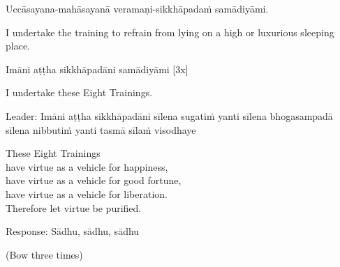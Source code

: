 Uccāsayana-mahāsayanā veramaṇi-sikkhāpadaṁ samādiyāmi.

\begin{english-verses}
  I undertake the training to refrain from lying on a high or luxurious sleeping place.
\end{english-verses}

Imāni aṭṭha sikkhāpadāni samādiyāmi \hfill{[3x]}

\begin{english-verses}
  I undertake these Eight Trainings.
\end{english-verses}

\begin{pali-hang}
Leader: Imāni aṭṭha sikkhāpadāni sīlena sugatiṁ yanti sīlena bhogasampadā sīlena nibbutiṁ yanti tasmā sīlaṁ visodhaye
\end{pali-hang}

\begin{english-verses}
  These Eight Trainings\\
  have virtue as a vehicle for happiness,\\
  have virtue as a vehicle for good fortune,\\
  have virtue as a vehicle for liberation.\\
  Therefore let virtue be purified.\hyperlink{endnote141-appendix}{\hypertarget{endnote141-body}{}}
  \end{english-verses}

Response: Sādhu, sādhu, sādhu

\begin{center}
  (Bow three times)
\end{center}

\clearpage
